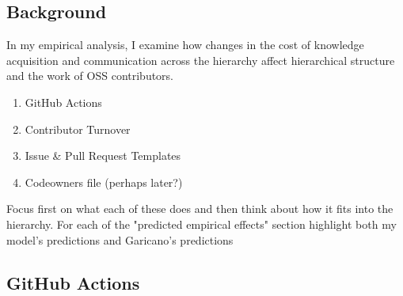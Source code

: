 \documentclass[source/paper/main.tex]{subfiles}
\begin{document}
\subsection{Background}
In my empirical analysis, I examine how changes in the cost of knowledge acquisition and communication across the hierarchy affect hierarchical structure and the work of OSS contributors. 

\begin{enumerate}
    \item GitHub Actions
    \item Contributor Turnover
    \item Issue \& Pull Request Templates
    \item Codeowners file (perhaps later?)
\end{enumerate}

Focus first on what each of these does and then think about how it fits into the hierarchy. For each of the "predicted empirical effects" section highlight both my model's predictions and Garicano's predictions

\subsection{GitHub Actions}
\end{document}
